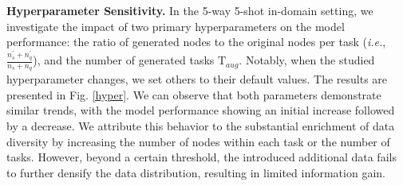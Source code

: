 \noindent \textbf{Hyperparameter Sensitivity.}
In the 5-way 5-shot in-domain setting, we investigate the impact of two primary hyperparameters on the model performance: the ratio of generated nodes to the original nodes per task (\textit{i.e.}, $\frac{n_{s}^\prime+n_{q}^\prime}{n_s+n_q}$), and the number of generated tasks $\mathrm{T}_{aug}$. Notably, when the studied hyperparameter changes, we set others to their default values. The results are presented in Fig. \ref{hyper}. We can observe that both parameters demonstrate similar trends, with the model performance showing an initial increase followed by a decrease. We attribute this behavior to the substantial enrichment of data diversity by increasing the number of nodes within each task or the number of tasks. However, beyond a certain threshold, the introduced additional data fails to further densify the data distribution, resulting in limited information gain. %
 